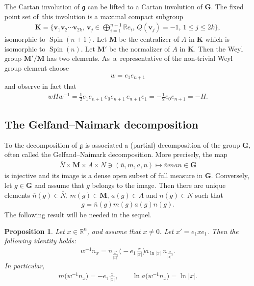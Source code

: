 \documentclass[pdftex]{sigma}
\DeclareMathOperator{\Spin}{Spin}
\numberwithin{equation}{section}
\newtheorem{prop}[theor]{Proposition}
\begin{document}
The Cartan involution of $\mathfrak g$ can be lifted to a Cartan involution of $\mathbf G$. The fixed point set of~this involution is a maximal compact subgroup
\begin{gather*}
\mathbf K= \bigg\{\mathbf v_1\mathbf v_2\cdots \mathbf v_{2k},\, \mathbf v_j \in \bigoplus_{i=1}^{n+1} \mathbb R e_i,\, Q(\mathbf v_j) = -1, \, 1\leq j \leq 2k\bigg\},
\end{gather*}
isomorphic to $\Spin(n+1)$.
Let $\mathbf M$ be the centralizer of $A$ in $\mathbf K$ which is isomorphic to $\Spin(n)$.
Let $\mathbf M'$ be the normalizer of $A$ in $\mathbf K$. Then the Weyl group $\mathbf M'/\mathbf M$ has two elements. As~a~rep\-resentative of the non-trivial Weyl group element choose
\begin{gather*}
w= e_1e_{n+1}
\end{gather*}
and observe in fact that
\begin{gather*}
wHw^{-1} = \frac{1}{2}e_1e_{n+1}\,e_0 e_{n+1}\, e_{n+1}e_1 = -\frac{1}{2}e_0e_{n+1}= -H.
\end{gather*}

\subsection{The Gelfand--Naimark decomposition}
To the decomposition of $\mathfrak g$ is associated a (partial) decomposition of the group $\mathbf G$, often called the Gelfand--Naimark decomposition.
More precisely, the map
\begin{gather*}
\overline N\times \mathbf M\times A\times N \ni (\overline n, m, a, n) \mapsto \overline n man\in \mathbf G
\end{gather*}
is injective and its image is a dense open subset of full measure in $\mathbf G$. Conversely, let $g\in \mathbf G$ and assume that $g$ belongs to the image. Then there are unique elements $\overline n(g)\in \overline N$, $m(g)\in \mathbf M$, $a(g)\in A$ and $n(g)\in N$ such that
\begin{gather*}
g=\overline n(g) m(g) a(g) n(g) .
\end{gather*}
The following result will be needed in the sequel.

\begin{prop} \label{Gelfanddec}
 Let $x\in \mathbb R^n$, and assume that $x\neq 0$. Let $x' = e_1xe_1$. Then the following iden\-tity holds:
\begin{gather}\label{GN-decomp}
w^{-1} \overline n_x
=\overline n_{\frac{x'}{\vert x\vert^2}} \bigg({-}e_1\frac{x}{\vert x\vert}\bigg) a_{\ln \vert x\vert}\
n_{\frac{x}{\vert x\vert^2}} .
\end{gather}
In particular,
\begin{gather*}
m\big(w^{-1} \overline n_x\big) = -e_1\frac{x}{\vert x\vert},\qquad
\ln a\big(w^{-1}\overline n_x\big)=\ln \vert x\vert .
\end{gather*}
\end{prop}
\end{document}
